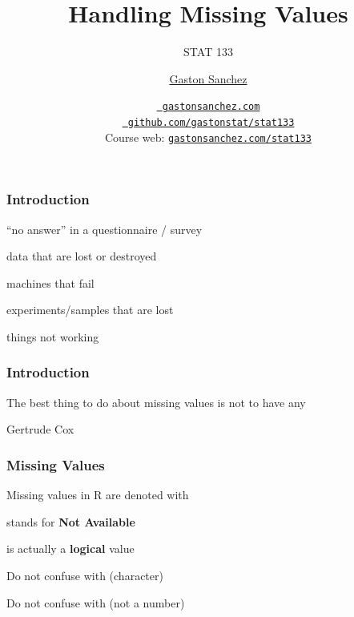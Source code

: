 \documentclass[12pt]{beamer}\usepackage[]{graphicx}\usepackage[]{color}
\title{Handling Missing Values}
\subtitle{STAT 133}
\author{\href{http://www.gastonsanchez.com}{Gaston Sanchez}}
\institute{Department of Statistics, UC{\textendash}Berkeley}
\date{\href{http://www.gastonsanchez.com}{\tt \scriptsize \color{foreground} gastonsanchez.com}
\\[-4pt]
\href{http://github.com/gastonstat/stat133}{\tt \scriptsize \color{foreground} github.com/gastonstat/stat133}
\\[-4pt]
{\scriptsize Course web: \href{http://www.gastonsanchez.com/stat133}{\tt gastonsanchez.com/stat133}}
}
\begin{document}
{
  \frame{
    \titlepage
  } 
}


\begin{frame}
\begin{center}
\Huge{}
\end{center}
\end{frame}


\begin{frame}[fragile]
\frametitle{Introduction}

\bbi
  \item ``no answer'' in a questionnaire / survey
  \item data that are lost or destroyed
  \item machines that fail
  \item experiments/samples that are lost
  \item things not working
\ei
\eb

\end{frame}


\begin{frame}
\frametitle{Introduction}

{\Large The best thing to do about missing values is not to have any}

\bigskip
Gertrude Cox

\end{frame}


\begin{frame}
\frametitle{Missing Values}

\bbi
  \item Missing values in R are denoted with {\hilit {}}
  \item {} stands for \textbf{Not Available}
  \item {} is actually a \textbf{logical} value
  \item Do not confuse  with  (character)
  \item Do not confuse  with  (not a number)
\ei
\eb

\end{frame}
\end{document}
